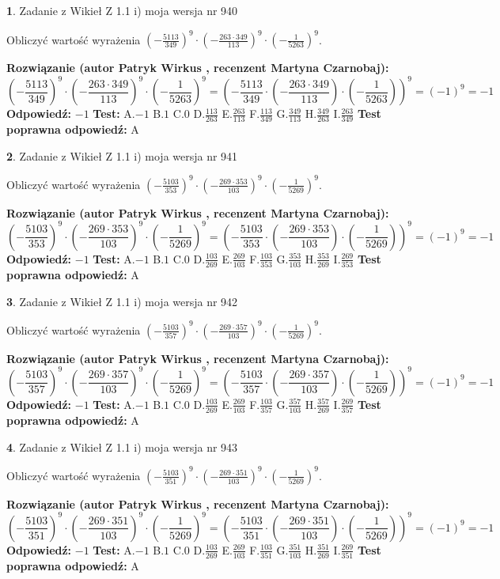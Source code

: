 \documentclass[12pt, a4paper]{article}
\theoremstyle{definition} %
\newtheorem{zad}{}
\newcommand{\zadStart}[1]{\begin{zad}#1\newline}
\newcommand{\zadStop}{\end{zad}}
\newcommand{\rozwStart}[2]{\noindent \textbf{Rozwiązanie (autor #1 , recenzent #2): }\newline}
\newcommand{\rozwStop}{\newline}
\newcommand{\odpStart}{\noindent \textbf{Odpowiedź:}\newline}
\newcommand{\odpStop}{\newline}
\newcommand{\testStart}{\noindent \textbf{Test:}\newline}
\newcommand{\testStop}{\newline}
\newcommand{\kluczStart}{\noindent \textbf{Test poprawna odpowiedź:}\newline}
\newcommand{\kluczStop}{\newline}
\begin{document}
\zadStart{Zadanie z Wikieł Z 1.1 i) moja wersja nr 940}

Obliczyć wartość wyrażenia $(-\frac{5113}{349})^{9} \cdot (-\frac{263 \cdot 349}{113})^{9} \cdot (-\frac{1}{5263})^{9}$.
\zadStop
\rozwStart{Patryk Wirkus}{Martyna Czarnobaj}
$$(-\frac{5113}{349})^{9} \cdot (-\frac{263 \cdot 349}{113})^{9} \cdot (-\frac{1}{5263})^{9} = (-\frac{5113}{349} \cdot (-\frac{263 \cdot 349}{113}) \cdot (-\frac{1}{5263}))^{9} = (-1)^{9} = -1$$
\rozwStop
\odpStart
$-1$
\odpStop
\testStart
A.$-1$ B.$1$ C.$0$ D.$\frac{113}{263}$ E.$\frac{263}{113}$
F.$\frac{113}{349}$ G.$\frac{349}{113}$
H.$\frac{349}{263}$
I.$\frac{263}{349}$
\testStop
\kluczStart
A
\kluczStop



\zadStart{Zadanie z Wikieł Z 1.1 i) moja wersja nr 941}

Obliczyć wartość wyrażenia $(-\frac{5103}{353})^{9} \cdot (-\frac{269 \cdot 353}{103})^{9} \cdot (-\frac{1}{5269})^{9}$.
\zadStop
\rozwStart{Patryk Wirkus}{Martyna Czarnobaj}
$$(-\frac{5103}{353})^{9} \cdot (-\frac{269 \cdot 353}{103})^{9} \cdot (-\frac{1}{5269})^{9} = (-\frac{5103}{353} \cdot (-\frac{269 \cdot 353}{103}) \cdot (-\frac{1}{5269}))^{9} = (-1)^{9} = -1$$
\rozwStop
\odpStart
$-1$
\odpStop
\testStart
A.$-1$ B.$1$ C.$0$ D.$\frac{103}{269}$ E.$\frac{269}{103}$
F.$\frac{103}{353}$ G.$\frac{353}{103}$
H.$\frac{353}{269}$
I.$\frac{269}{353}$
\testStop
\kluczStart
A
\kluczStop



\zadStart{Zadanie z Wikieł Z 1.1 i) moja wersja nr 942}

Obliczyć wartość wyrażenia $(-\frac{5103}{357})^{9} \cdot (-\frac{269 \cdot 357}{103})^{9} \cdot (-\frac{1}{5269})^{9}$.
\zadStop
\rozwStart{Patryk Wirkus}{Martyna Czarnobaj}
$$(-\frac{5103}{357})^{9} \cdot (-\frac{269 \cdot 357}{103})^{9} \cdot (-\frac{1}{5269})^{9} = (-\frac{5103}{357} \cdot (-\frac{269 \cdot 357}{103}) \cdot (-\frac{1}{5269}))^{9} = (-1)^{9} = -1$$
\rozwStop
\odpStart
$-1$
\odpStop
\testStart
A.$-1$ B.$1$ C.$0$ D.$\frac{103}{269}$ E.$\frac{269}{103}$
F.$\frac{103}{357}$ G.$\frac{357}{103}$
H.$\frac{357}{269}$
I.$\frac{269}{357}$
\testStop
\kluczStart
A
\kluczStop



\zadStart{Zadanie z Wikieł Z 1.1 i) moja wersja nr 943}

Obliczyć wartość wyrażenia $(-\frac{5103}{351})^{9} \cdot (-\frac{269 \cdot 351}{103})^{9} \cdot (-\frac{1}{5269})^{9}$.
\zadStop
\rozwStart{Patryk Wirkus}{Martyna Czarnobaj}
$$(-\frac{5103}{351})^{9} \cdot (-\frac{269 \cdot 351}{103})^{9} \cdot (-\frac{1}{5269})^{9} = (-\frac{5103}{351} \cdot (-\frac{269 \cdot 351}{103}) \cdot (-\frac{1}{5269}))^{9} = (-1)^{9} = -1$$
\rozwStop
\odpStart
$-1$
\odpStop
\testStart
A.$-1$ B.$1$ C.$0$ D.$\frac{103}{269}$ E.$\frac{269}{103}$
F.$\frac{103}{351}$ G.$\frac{351}{103}$
H.$\frac{351}{269}$
I.$\frac{269}{351}$
\testStop
\kluczStart
A
\kluczStop
\end{document}

